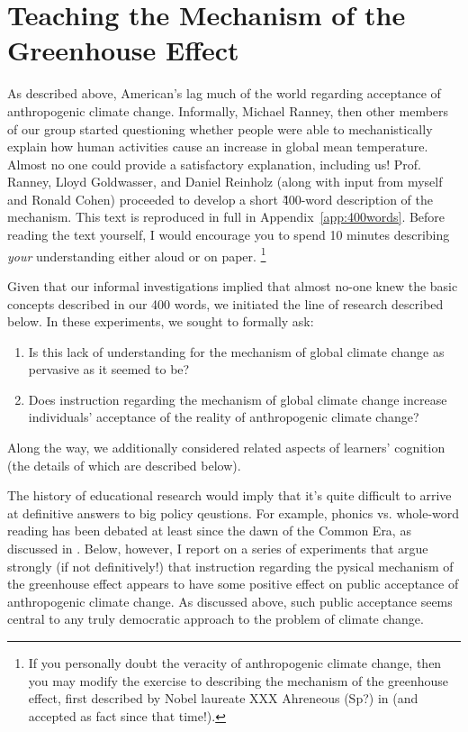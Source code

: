 \graphicspath{{mechanism/}}

\chapter{Teaching the Mechanism of the Greenhouse Effect}
\label{chap:mechanism}

As described above, American's lag much of the world regarding acceptance of
anthropogenic climate change. Informally, Michael Ranney, then other members of
our group started questioning whether people were able to mechanistically
explain how human activities cause an increase in global mean temperature.
Almost no one could provide a satisfactory explanation, including us! Prof.
Ranney, Lloyd Goldwasser, and Daniel Reinholz (along with input from myself and
Ronald Cohen) proceeded to develop a short \~400-word description of the
mechanism. This text is reproduced in full in Appendix~\ref{app:400words}.
Before reading the text yourself, I would encourage you to spend 10 minutes
describing \emph{your} understanding either aloud or on paper.
\footnote{If you personally doubt the veracity of anthropogenic climate change,
    then you may modify the exercise to describing the mechanism of the
    greenhouse effect, first described by Nobel laureate XXX Ahreneous (Sp?) in
    \citeyear{Ahreneous} (and accepted as fact since that time!).}

Given that our informal investigations implied that almost no-one knew the basic
concepts described in our 400 words, we initiated the line of research described
below. In these experiments, we sought to formally ask:

\begin{enumerate}
\item Is this lack of understanding for the mechanism of global climate change
    as pervasive as it seemed to be?
\item Does instruction regarding the mechanism of global climate change increase
    individuals' acceptance of the reality of anthropogenic climate change?
\end{enumerate}
Along the way, we additionally considered related aspects of learners'
cognition (the details of which are described below).

The history of educational research would imply that it’s quite difficult to
arrive at definitive answers to big policy qeustions. For example, phonics vs.
whole-word reading has been debated at least since the dawn of the Common Era,
as discussed in \textcite{history-reading-instruction}. Below, however, I report
on a series of experiments that argue strongly (if not definitively!) that
instruction regarding the pysical mechanism of the greenhouse effect appears to
have some positive effect on public acceptance of anthropogenic climate change.
As discussed above, such public acceptance seems central to any truly democratic
approach to the problem of climate change.

